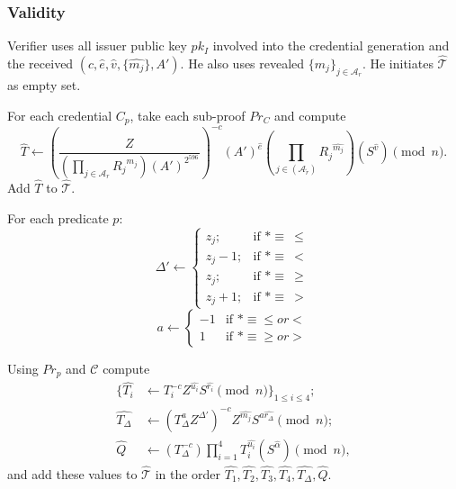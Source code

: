\subsubsection{Validity}
Verifier uses all issuer public key $pk_I$ involved into the credential generation and  the received $(c,\widehat{e},\widehat{v},\{\widehat{m_j}\},A')$. He also uses revealed 
$\{m_j\}_{j \in \mathcal{A}_r}$. He initiates $\widehat{\mathcal{T}}$ as empty set.


\begin{legal}
\item For each credential $C_p$, take each sub-proof $Pr_C$ and compute 
\begin{equation}\label{eq:that}
 \widehat{T} \leftarrow \left(
    \frac{Z}
    { \left(
        \prod_{j \in \mathcal{A}_r}{R_j}^{m_j}
    \right)
    (A')^{2^{596}}
    }\right)^{-c}
    (A')^{\widehat{e}}
    \left(\prod_{j\in (\mathcal{A}_{\widetilde{r}})}{R_j}^{\widehat{m_j}}\right)
    (S^{\widehat{v}})\pmod{n}.
\end{equation}
Add $\widehat{T}$ to $\widehat{\mathcal{T}}$.
\item For each predicate $p$:
$$
\Delta' \leftarrow \begin{cases}
z_j; & \mbox{if } * \equiv\ \leq\\
z_j-1; & \mbox{if } * \equiv\ <\\
z_j; & \mbox{if } * \equiv\ \geq\\
z_j+1; & \mbox{if } * \equiv\ >
\end{cases}
$$
$$
a \leftarrow \begin{cases}
-1 & \mbox{if } * \equiv \leq or <\\
1  & \mbox{if } * \equiv \geq or >
\end{cases}
$$
\begin{legal}
\item Using $Pr_p$ and $\mathcal{C}$ compute 
\begin{align}
\{\widehat{T_i} &\leftarrow T_i^{-c}Z^{\widehat{u_i}} S^{\widehat{r_i}}\pmod{n}\}_{1\leq i \leq 4};\label{eq:pr2}\\
\widehat{T_{\Delta}} &\leftarrow \left(T_{\Delta}^{a}Z^{\Delta'}\right)^{-c}Z^{\widehat{m_j}}S^{a\widehat{r_{\Delta}}}\pmod{n};\label{eq:pr1}\\
\widehat{Q}&\leftarrow (T_{\Delta}^{-c})\prod_{i=1}^{4}T_i^{\widehat{u_i}}(S^{\widehat{\alpha}})\pmod{n}\label{eq:pr3},
\end{align}
and add these values to  $\widehat{\mathcal{T}}$ in the order $\widehat{T_1},\widehat{T_2} ,\widehat{T_3},\widehat{T_4},\widehat{T_{\Delta}},\widehat{Q}$.
\end{legal}
\end{legal}
